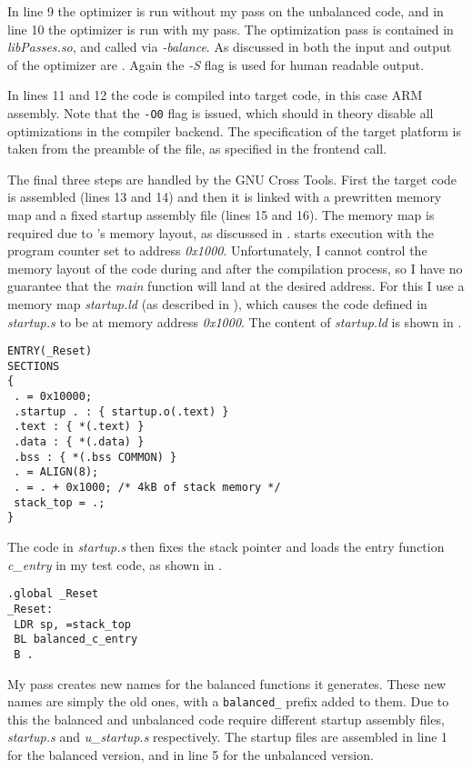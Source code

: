 In line 9 the \llvm{} optimizer is run without my pass on the unbalanced code, and in line 10 the optimizer is run with my pass.
The optimization pass is contained in \emph{libPasses.so}, and called via \emph{-balance}.
As discussed in  both the input and output of the optimizer are \ir{}.
Again the \emph{-S} flag is used for human readable output.

In lines 11 and 12 the \ir{} code is compiled into target code, in this case ARM assembly.
Note that the \texttt{-O0} flag is issued, which should in theory disable all optimizations in the compiler backend.
The specification of the target platform is taken from the preamble of the \ir{} file, as specified in the frontend call.

The final three steps are handled by the GNU Cross Tools.
First the target code is assembled (lines 13 and 14) and then it is linked with a prewritten memory map and a fixed startup assembly file (lines 15 and 16).
The memory map is required due to \qemu{}'s memory layout, as discussed in .
\qemu{} starts execution with the program counter set to address \emph{0x1000}.
Unfortunately, I cannot control the memory layout of the code during and after the compilation process, so I have no guarantee that the \emph{main} function will land at the desired address.
For this I use a memory map \emph{startup.ld} (as described in \cite{armbare}), which causes the code defined in \emph{startup.s} to be at memory address \emph{0x1000}.
The content of \emph{startup.ld} is shown in .

\begin{lstlisting}[caption=Memory map in \emph{startup.ld}, label=lst:mmap]
ENTRY(_Reset)
SECTIONS
{
 . = 0x10000;
 .startup . : { startup.o(.text) }
 .text : { *(.text) }
 .data : { *(.data) }
 .bss : { *(.bss COMMON) }
 . = ALIGN(8);
 . = . + 0x1000; /* 4kB of stack memory */
 stack_top = .;
}
\end{lstlisting}

The code in \emph{startup.s} then fixes the stack pointer and loads the entry function \emph{c\_entry} in my test code, as shown in .

\begin{lstlisting}[caption=Startup assembly code, label=lst:startup]
.global _Reset
_Reset:
 LDR sp, =stack_top
 BL balanced_c_entry
 B .
\end{lstlisting}

My pass creates new names for the balanced functions it generates.
These new names are simply the old ones, with a \texttt{balanced\_} prefix added to them.
Due to this the balanced and unbalanced code require different startup assembly files, \emph{startup.s} and \emph{u\_startup.s} respectively.
The startup files are assembled in line 1 for the balanced version, and in line 5 for the unbalanced version.

